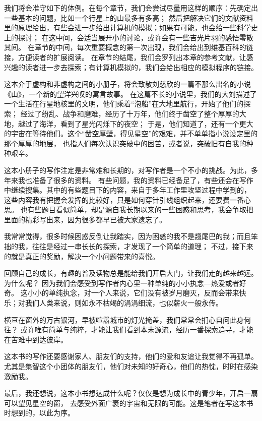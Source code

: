 \documentclass[a4paper,10.5pt]{book}
\begin{document}
我们将会准守如下的体例。在每个章节，我们会尝试尽量用这样的顺序：先确定出一些基本的问题，比如一个行星上的山最多有多高；
然后把解决它们的文献资料里的原理给出，有些会进一步给出计算机的模拟；如果有可能，也会给一些科学史上的探讨；
在这中间，会适当展开小的讨论，或许会有一些吉光片羽的感悟零散其间。
在章节的中间，每次重要概念的第一次出现，我们会给出到维基百科的链接，方便读者的扩展阅读。
在章节的结尾，我们会罗列出本章的参考文献，让感兴趣的读者进一步去探索；有计算机模拟的，我们会给出相应的模拟程序的链接。

这本介于虚构和非虚构之间的小册子，将会致敬刘慈欣的一篇不那么出名的小说《山》，一个新的望洋兴叹的寓言故事。
在这篇不长的小说里，我们的大刘描述了一个生活在行星地核里的文明，他们乘着“泡船”在大地里航行，开始了他们的探索；
经过了纷乱、战争和磨难，经历了十万年，他们终于凿空了整个厚厚的大地，越过了海洋，看到了星光闪烁下的夜空；
于是，他们知道了，还有一个更大的宇宙在等待他们。这个“凿空厚壁，得见星空”的艰难，并不单单指小说设定里的那个厚厚的地层，
也指人们每次认识突破中的困苦，或者说，突破旧有自我的种种艰辛。

这本小册子的写作注定是非常难和长期的，对写作者是一个不小的挑战。为此，多年来我也准备了很多的资料。
有些问题，我的资料已经备足了，有些还会在写作中继续搜集。其中的有些题目下的内容，来自于多年工作里攻坚过程中学到的，
这些内容我有把握会发挥的比较好，只是如何穿针引线组织起来，还要费一番心思。
也有些题目看似简单，却是源自我长期以来的一些困惑和思考，我会争取把里面的精彩写出来，因为很多都早已被大家遗忘了。

我常常觉得，很多时候困惑反倒让我踏实，因为困惑的我不是翘尾巴的我；而且笨拙的我，往往是经过一串长长的探索，才发现了一个简单的道理；
不过，接下来的就是真正的奖励，解决一个小问题带来的喜悦。

回顾自己的成长，有趣的普及读物总是能给我们开启大门，让我们走的越来越远。为什么呢？
因为我们会感受到写作者内心里一种单纯的小小执念—热爱或者好奇。
这小小的单纯执念，对一个人来说，它们没有被岁月磨灭，反而会带来快乐；对我们人类来说，则如永不枯竭的涓涓细流，也似薪火一般永传。

横亘在窗外的万古银河，早被喧嚣城市的灯光掩盖，我们常常会扪心自问此身何往？
或许唯有简单与纯粹，才能让我们看到本末源流，经历一番探索追寻，才能在苦难中到达彼岸。

这本书的写作还要感谢家人、朋友们的支持，他们的爱和友谊让我觉得不再孤单。
尤其是集智这个小团体的朋友们，他们对未知的好奇心，他们的热忱，时时在感染激励我。

最后，我还想说，这本小书想达成什么呢？仅仅是想为成长中的青少年，开启一扇可以望见星空的窗，
去感受外面广袤的宇宙和无限的可能。这是笔者在写这本书时想到的，以此为序。
\end{document}
